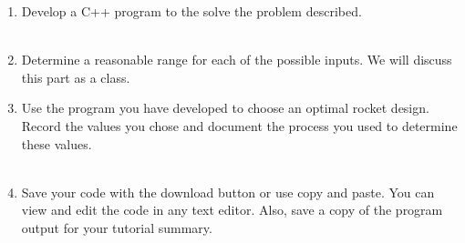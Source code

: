 \documentclass[12pt]{article}
\begin{document}
\begin{description}[labelindent=1cm]
%
%	
%
%
%
%	
%	
%	
%	
%	
%	
%
%
%		

	\item[\textbf{\underline{Part 3 - Testing:}}] \hfill \vspace{0mm}
	\begin{enumerate}
	
		\item Develop a  C++ program to the solve the problem described. \\\\
		
		\item Determine a reasonable range for each of the possible inputs. We will discuss this part as a class. \\
		
		\item Use the program you have developed to choose an optimal rocket design. Record the values you chose and document the process you used to determine these values.  \\\\
		
	
		\item Save your code with the download button or use copy and paste. You can view and edit the code in any text editor. Also, save a copy of the program output for your tutorial summary. \\\\

	\end{enumerate}

\newpage
\item[\textbf{\underline{Solution Code:}}] \hfill \vspace{0mm}
%
%
%
%


\end{description}
\end{document}
